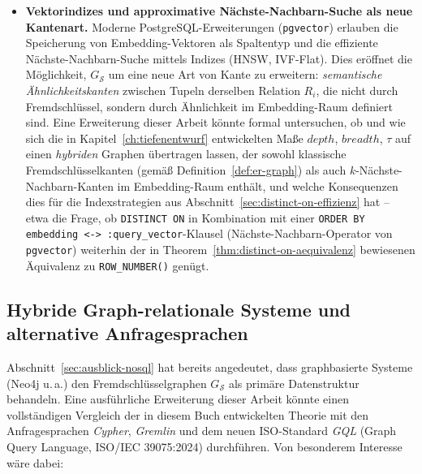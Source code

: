 ﻿\documentclass[a4paper,12pt]{report}
\theoremstyle{definition}
\theoremstyle{remark}
\newcommand{\depth}{\mathit{depth}}
\newcommand{\breadth}{\mathit{breadth}}
\begin{document}
\begin{itemize}
  \item \textbf{Vektorindizes und approximative Nächste-Nachbarn-Suche
    als neue Kantenart.} Moderne PostgreSQL-Erweiterungen
    (\texttt{pgvector}) erlauben die Speicherung von
    Embedding-Vektoren als Spaltentyp und die effiziente
    Nächste-Nachbarn-Suche mittels Indizes (HNSW, IVF-Flat). Dies
    eröffnet die Möglichkeit, $G_{\mathcal{S}}$ um eine neue Art von
    Kante zu erweitern: \emph{semantische Ähnlichkeitskanten}
    zwischen Tupeln derselben Relation $R_i$, die nicht durch
    Fremdschlüssel, sondern durch Ähnlichkeit im
    Embedding-Raum definiert sind. Eine Erweiterung dieser Arbeit
    könnte formal untersuchen, ob und wie sich die in
    Kapitel~\ref{ch:tiefenentwurf} entwickelten Maße $\depth$,
    $\breadth$, $\tau$ auf einen \emph{hybriden} Graphen
    übertragen lassen, der sowohl klassische
    Fremdschlüsselkanten (gemäß Definition~\ref{def:er-graph}) als
    auch $k$-Nächste-Nachbarn-Kanten im Embedding-Raum enthält, und
    welche Konsequenzen dies für die Indexstrategien aus
    Abschnitt~\ref{sec:distinct-on-effizienz} hat -- etwa die Frage,
    ob \texttt{DISTINCT ON} in Kombination mit einer
    \texttt{ORDER BY embedding <-> :query\_vector}-Klausel
    (Nächste-Nachbarn-Operator von \texttt{pgvector}) weiterhin der in
    Theorem~\ref{thm:distinct-on-aequivalenz} bewiesenen Äquivalenz
    zu \texttt{ROW\_NUMBER()} genügt.
\end{itemize}

\subsection{Hybride Graph-relationale Systeme und alternative
Anfragesprachen}
\label{sec:ausblick-hybrid}

Abschnitt~\ref{sec:ausblick-nosql} hat bereits angedeutet, dass
graphbasierte Systeme (Neo4j u.\,a.) den Fremdschlüsselgraphen
$G_{\mathcal{S}}$ als primäre Datenstruktur behandeln. Eine
ausführliche Erweiterung dieser Arbeit könnte einen vollständigen
Vergleich der in diesem Buch entwickelten Theorie mit den
Anfragesprachen \emph{Cypher}, \emph{Gremlin} und dem neuen
ISO-Standard \emph{GQL} (Graph Query Language, ISO/IEC 39075:2024)
durchführen. Von besonderem Interesse wäre dabei:
\end{document}
